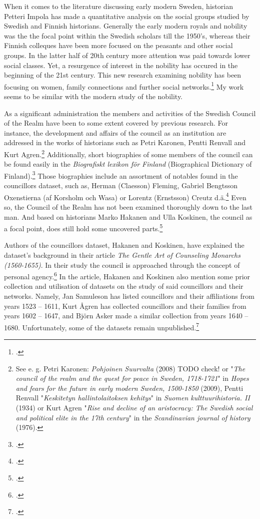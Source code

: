 When it comes to the literature discussing early modern Sweden, historian Petteri Impola has made a quantitative analysis on the social groups studied by Swedish and Finnish historians. Generally the early modern royals and nobility was the the focal point within the Swedish scholars till the 1950's, whereas their Finnish colleques have been more focused on the peasants and other social groups. In the latter half of 20th century more attention was paid towards lower social classes. Yet, a resurgence of interest in the nobility has occured in the beginning of the 21st century. This new research examining nobility has been focusing on women, family connections and further social networks.\footcite{impola2024} My work seems to be similar with the modern study of the nobility.

As a significant administration the members and activities of the Swedish Council of the Realm have been to some extent covered by previous research. For instance, the development and affairs of the council as an institution are addressed in the works of historians such as Petri Karonen, Pentti Renvall and Kurt Agren.\footnote{See e. g. Petri Karonen: \textit{Pohjoinen Suurvalta} (2008) TODO check! or "\textit{The council of the realm and the quest for peace in Sweden, 1718-1721}" in \textit{Hopes and fears for the future in early modern Sweden, 1500-1850} (2009), Pentti Renvall "\textit{Keskitetyn hallintolaitoksen kehitys}" in \textit{Suomen kulttuurihistoria. II} (1934) or Kurt Agren "\textit{Rise and decline of an aristocracy: The Swedish social and political elite in the 17th century}" in the \textit{Scandinavian journal of history} (1976).} Additionally, short biographies of some members of the council can be found easily in the \textit{Biografiskt lexikon för Finland} (Biographical Dictionary of Finland).\footcite{blf} Those biographies include an assortment of notables found in the councillors dataset, such as, Herman (Claesson) Fleming, Gabriel Bengtsson Oxenstierna (af Korsholm och Wasa) or Lorentz (Ernstsson) Creutz d.ä.\footcite{blf-list} Even so, the Council of the Realm has not been examined thoroughly down to the last man. And based on historians Marko Hakanen and Ulla Koskinen, the council as a focal point, does still hold some uncovered parts.\footcite[p. 47-48.]{HakanenAKoskinen2017} 

Authors of the councillors dataset, Hakanen and Koskinen, have explained the dataset's background in their article \textit{The Gentle Art of Counseling Monarchs (1560-1655)}. In their study the council is approached through the concept of personal agency.\footcite{HakanenAKoskinen2017} In the article, Hakanen and Koskinen also mention some prior collection and utilisation of datasets on the study of said councillors and their networks. Namely, Jan Samuleson has listed councillors and their affiliations from years 1523 – 1611, Kurt Ågren has collected councillors and their families from years 1602 – 1647, and Björn Asker made a similar collection from years 1640 – 1680. Unfortunately, some of the datasets remain unpublished.\footcite[p. 48, 67 (cite 4).]{HakanenAKoskinen2017} 

